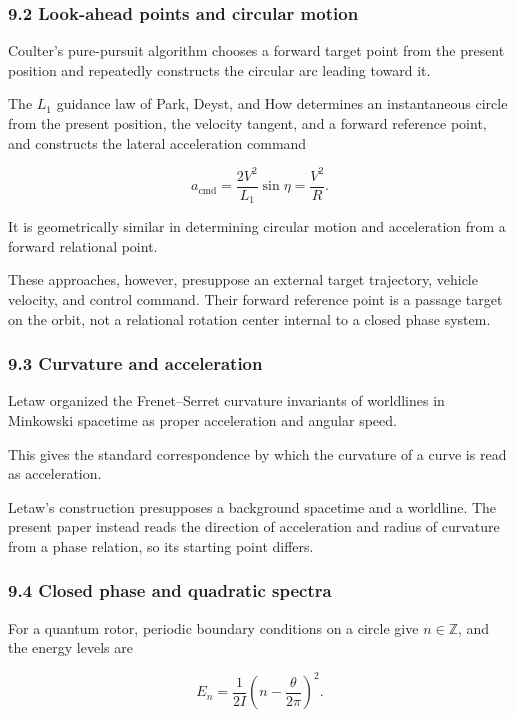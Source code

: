 \documentclass[
  a4paper,
]{article}
\begin{document}
\subsubsection{9.2 Look-ahead points and circular
motion}\label{look-ahead-points-and-circular-motion}

Coulter's pure-pursuit algorithm chooses a forward target point from the
present position and repeatedly constructs the circular arc leading
toward it.

The \(L_1\) guidance law of Park, Deyst, and How determines an
instantaneous circle from the present position, the velocity tangent,
and a forward reference point, and constructs the lateral acceleration
command

\[
a_{\mathrm{cmd}}
=\frac{2V^2}{L_1}\sin\eta
=\frac{V^2}{R}.
\]

It is geometrically similar in determining circular motion and
acceleration from a forward relational point.

These approaches, however, presuppose an external target trajectory,
vehicle velocity, and control command. Their forward reference point is
a passage target on the orbit, not a relational rotation center internal
to a closed phase system.

\subsubsection{9.3 Curvature and
acceleration}\label{curvature-and-acceleration}

Letaw organized the Frenet--Serret curvature invariants of worldlines in
Minkowski spacetime as proper acceleration and angular speed.

This gives the standard correspondence by which the curvature of a curve
is read as acceleration.

Letaw's construction presupposes a background spacetime and a worldline.
The present paper instead reads the direction of acceleration and radius
of curvature from a phase relation, so its starting point differs.

\subsubsection{9.4 Closed phase and quadratic
spectra}\label{closed-phase-and-quadratic-spectra}

For a quantum rotor, periodic boundary conditions on a circle give
\(n\in\mathbb Z\), and the energy levels are

\[
E_n
=\frac{1}{2I}
\left(
n-\frac{\theta}{2\pi}
\right)^2.
\]
\end{document}
